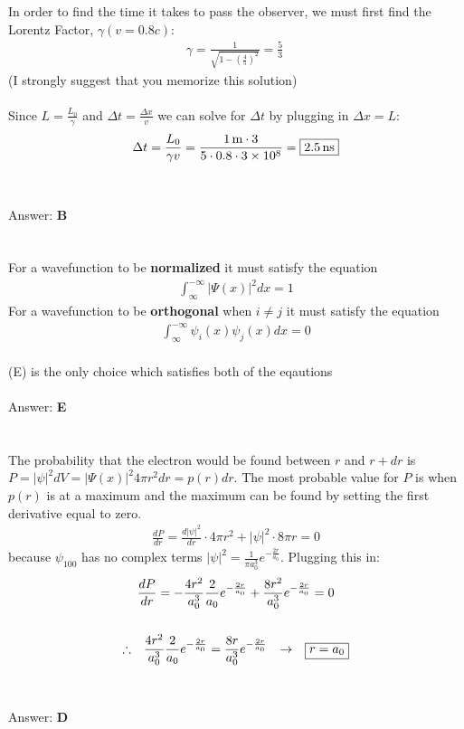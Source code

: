 \documentclass[12pt]{article}
\newcommand{\Answer}[1]{Answer: \textbf{#1}}
\newcommand{\Problem}[3]{
    \setcounter{section}{#1}
    \addtocounter{section}{-1}
    \section{}
    #3\\\\
    \Answer{#2}
}
\begin{document}
\Problem{24}{B}{%
In order to find the time it takes to pass the observer, we must first find the Lorentz Factor, $\gamma (v = 0.8c)$:
\begin{align}
\gamma = \frac{1}{\sqrt{1- {\left(\frac{4}{5}\right)}^2}}= \frac{5}{3}\
\end{align}
(I strongly suggest that you memorize this solution)
\\\\
Since $L = \frac{L_{0}}{\gamma}$ and $\Delta t = \frac{\Delta x}{v}$ we can solve for $\Delta t$ by plugging in $\Delta x = L$:
\begin{align}
\Delta t = \frac{L_{0}}{\gamma v} = \frac{1\,\text{m} \cdot 3}{5 \cdot 0.8 \cdot 3\times 10^{8}} = \boxed{2.5\,\text{ns}}\nonumber
\end{align}
}


\Problem{25}{E}{%
For a wavefunction to be  \textbf{normalized} it must satisfy the equation
\begin{align}
\int_{\infty}^{-\infty} |\Psi (x)| ^{2} dx = 1
\end{align}
For a wavefunction to be \textbf{orthogonal} when $i \neq j$ it must satisfy the equation
\begin{align}
\int_{\infty}^{-\infty} \psi_{i} (x) \psi_{j} (x)  dx = 0
\end{align}
\\
(E) is the only choice which satisfies both of the eqautions
}

\Problem{26}{D}{%
The probability that the electron would be found between $r$ and $r+dr$ is $P = |\psi |^{2} dV = |\Psi (x) |^{2} 4 \pi r^{2} dr = p(r)dr$. The most probable value for $P$ is when $p(r)$ is at a maximum and the maximum can be found by setting the first derivative equal to zero.
\begin{align}
\frac{dP}{dr} = \frac{d|\psi |^{2}}{dr} \cdot 4 \pi r^2 + |\psi |^{2} \cdot 8 \pi r = 0
\end{align}
because $\psi_{100}$ has no complex terms $|\psi |^{2} = \frac{1}{\pi a_{0}^3} e^{-\frac{2 r}{a_{0}}}$. Plugging  this in:
\begin{gather}
\frac{dP}{dr} = -\frac{4 r^2}{a_{0}^3} \frac{2}{a_{0}} e^{-\frac{2 r}{a_{0}}} + \frac{8 r^2}{a_{0}^3} e^{-\frac{2 r}{a_{0}}} = 0\nonumber\\
\nonumber\\
\therefore \hspace{.1in} \frac{4 r^2}{a_{0}^3} \frac{2}{a_{0}} e^{-\frac{2 r}{a_{0}}} = \frac{8 r}{a_{0}^3} e^{-\frac{2 r}{a_{0}}} \hspace{.1in} \rightarrow \hspace{.1in} \boxed {r = a_{0}}\nonumber
\end{gather}
}
\end{document}
